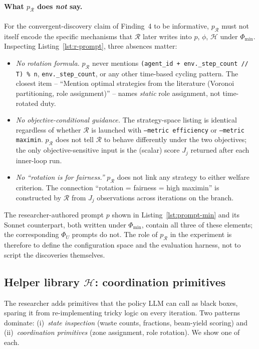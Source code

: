 \documentclass{article}
\newcommand{\cR}{\mathcal{R}}
\begin{document}
\paragraph{What $p_\cR$ does \emph{not} say.}
For the convergent-discovery claim of Finding~4 to be informative, $p_\cR$ must not itself encode the specific mechanisms that $\cR$ later writes into $p$, $\phi$, $\mathcal{H}$ under $\Phi_{\min}$. Inspecting Listing~\ref{lst:r-prompt}, three absences matter:
\begin{itemize}
  \item \emph{No rotation formula.} $p_\cR$ never mentions \texttt{(agent\_id + env.\_step\_count // T) \% n}, \texttt{env.\_step\_count}, or any other time-based cycling pattern. The closest item -- ``Mention optimal strategies from the literature (Voronoi partitioning, role assignment)'' -- names \emph{static} role assignment, not time-rotated duty.
  \item \emph{No objective-conditional guidance.} The strategy-space listing is identical regardless of whether $\cR$ is launched with \texttt{--metric efficiency} or \texttt{--metric maximin}. $p_\cR$ does not tell $\cR$ to behave differently under the two objectives; the only objective-sensitive input is the (scalar) score $J_j$ returned after each inner-loop run.
  \item \emph{No ``rotation is for fairness.''} $p_\cR$ does not link any strategy to either welfare criterion. The connection ``rotation = fairness = high maximin'' is constructed by $\cR$ from $J_j$ observations across iterations on the branch.
\end{itemize}
The researcher-authored prompt $p$ shown in Listing~\ref{lst:prompt-min} and its Sonnet counterpart, both written under $\Phi_{\min}$, contain all three of these elements; the corresponding $\Phi_U$ prompts do not. The role of $p_\cR$ in the experiment is therefore to define the configuration space and the evaluation harness, not to script the discoveries themselves.


\subsection{Helper library $\mathcal{H}$: coordination primitives}
\label{app:art-helpers}

The researcher adds primitives that the policy LLM can call as black boxes, sparing it from re-implementing tricky logic on every iteration. Two patterns dominate: (i)~\emph{state inspection} (waste counts, fractions, beam-yield scoring) and (ii)~\emph{coordination primitives} (zone assignment, role rotation). We show one of each.
\end{document}
